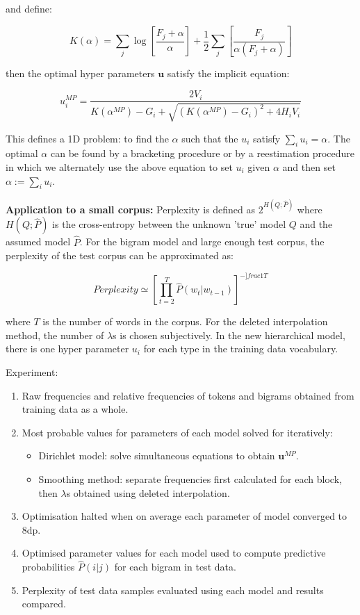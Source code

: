 \noindent and define:

\begin{equation}
K(\alpha)=\sum_{j}\log\left[\frac{F_{j}+\alpha}{\alpha}\right]+\frac{1}{2}\sum_{j}\left[\frac{F_{j}}{\alpha(F_{j}+\alpha)}\right]
\end{equation}

\noindent then the optimal hyper parameters $\boldsymbol{u}$ satisfy the implicit equation:

\begin{equation}
u_{i}^{MP}=\frac{2V_{i}}{K(\alpha^{MP})-G_{i}+\sqrt{(K(\alpha^{MP})-G_{i})^{2}+4H_{i}V_{i}}}
\end{equation}

\noindent This defines a 1D problem: to find the $\alpha$ such that the $u_{i}$ satisfy $\sum_{i}u_{i}=\alpha$. The optimal $\alpha$ can be found by a bracketing procedure or by a reestimation procedure in which we alternately use the above equation to set $u_{i}$ given $\alpha$ and then set $\alpha:=\sum_{i}u_{i}$.

\textbf{Application to a small corpus: } Perplexity is defined as $2^{H(Q;\hat{P})}$ where $H(Q;\hat{P})$ is the cross-entropy between the unknown 'true' model $Q$ and the assumed model $\hat{P}$. For the bigram model and large enough test corpus, the perplexity of the test corpus can be approximated as:

\begin{equation}
Perplexity\simeq\left[\prod_{t=2}^{T}\hat{P}(w_{t}|w_{t-1})\right]^{-]frac{1}{T}}
\end{equation}

\noindent where $T$ is the number of words in the corpus. For the deleted interpolation method, the number of $\lambda$s is chosen subjectively. In the new hierarchical model, there is one hyper parameter $u_{i}$ for each type in the training data vocabulary.

Experiment:
\begin{enumerate}
\item Raw frequencies and relative frequencies of tokens and bigrams obtained from training data as a whole.
\item Most probable values for parameters of each model solved for iteratively: 
\indent\begin{itemize}
 \item Dirichlet model: solve simultaneous equations to obtain $\boldsymbol{u}^{MP}$.
\item Smoothing method: separate frequencies first calculated for each block, then $\lambda$s obtained using deleted interpolation.
\end{itemize}
\item Optimisation halted when on average each parameter of model converged to 8dp.
\item Optimised parameter values for each model used to compute predictive probabilities $\hat{P}(i|j)$ for each bigram in test data.
\item Perplexity of test data samples evaluated using each model and results compared.
\end{enumerate}


